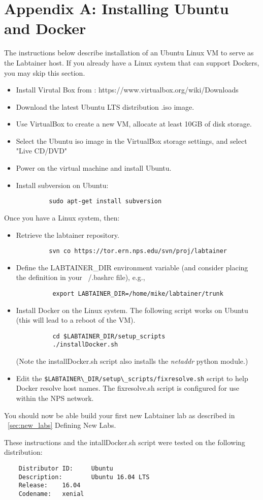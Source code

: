 \documentclass{article}
\begin{document}
\newpage
\appendix 
\section {Appendix A: Installing Ubuntu and Docker}
\label{sec:appendixA}
The instructions below describe installation of an Ubuntu Linux VM 
to serve as the Labtainer host.  If you already have a Linux system
that can support Dockers, you may skip this section.
\begin{itemize}
\item Install Virutal Box from : https://www.virtualbox.org/wiki/Downloads
\item Download the latest Ubuntu LTS distribution .iso image.
\item Use VirtualBox to create a new VM, allocate at least 10GB of disk storage.
\item Select the Ubuntu iso image in the VirtualBox storage settings, and select "Live CD/DVD"
\item Power on the virtual machine and install Ubuntu.
\item Install subversion on Ubuntu:
\begin{verbatim}
         sudo apt-get install subversion
\end{verbatim}
\end{itemize}

Once you have a Linux system, then:
\begin{itemize}
\item Retrieve the labtainer repository.
\begin{verbatim}
         svn co https://tor.ern.nps.edu/svn/proj/labtainer
\end{verbatim}

\item Define the LABTAINER\_DIR environment variable (and consider
placing the definition in your ~/.bashrc file), e.g., 
\begin{verbatim}
          export LABTAINER_DIR=/home/mike/labtainer/trunk
\end{verbatim}

\item Install Docker on the Linux system.  The following script works on Ubuntu (this will lead to a reboot of the VM).
\begin{verbatim}
          cd $LABTAINER_DIR/setup_scripts
          ./installDocker.sh
\end{verbatim}
(Note the installDocker.sh script also installs the \textit{netaddr} python module.)

\item Edit the \verb!$LABTAINER\_DIR/setup\_scripts/fixresolve.sh! script to help Docker resolve
host names.  The fixresolve.sh script is configured for use within the NPS network.
\end{itemize}
You should now be able build your first new Labtainer lab as described
in ~\ref{sec:new_labs} Defining New Labs.

These instructions and the intallDocker.sh script were tested on the following distribution:
\begin{verbatim}
    Distributor ID:     Ubuntu
    Description:        Ubuntu 16.04 LTS
    Release:    16.04
    Codename:   xenial
\end{verbatim}
\end{document}
